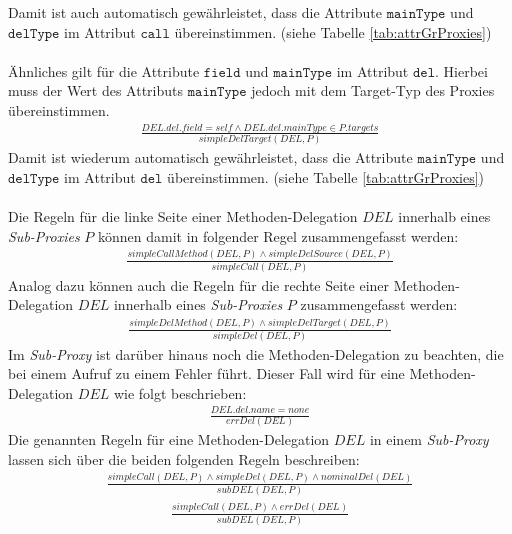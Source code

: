 \documentclass[a4paper,12pt]{article}
\begin{document}
Damit ist auch automatisch gewährleistet, dass die Attribute $\texttt{mainType}$ und $\texttt{delType}$ im Attribut $\texttt{call}$ übereinstimmen. (siehe Tabelle \ref{tab:attrGrProxies})\\\\
Ähnliches gilt für die Attribute $\texttt{field}$ und $\texttt{mainType}$ im Attribut $\texttt{del}$. Hierbei muss der Wert des Attributs $\texttt{mainType}$ jedoch mit dem Target-Typ des Proxies übereinstimmen.
\begin{gather*}
\frac{\mathit{DEL.del.field} = \mathit{self} \wedge  \mathit{DEL.del.mainType} \in \mathit{P.targets} }
{\mathit{simpleDelTarget(DEL, P)}}
\end{gather*}
Damit ist wiederum automatisch gewährleistet, dass die Attribute $\texttt{mainType}$ und $\texttt{delType}$ im Attribut $\texttt{del}$ übereinstimmen. (siehe Tabelle \ref{tab:attrGrProxies})\\\\
Die Regeln für die linke Seite einer Methoden-Delegation $\mathit{DEL}$ innerhalb eines \emph{Sub-Proxies} $P$ können damit in folgender Regel zusammengefasst werden:
\begin{gather*}
\frac{\mathit{simpleCallMethod(DEL,P)} \wedge \mathit{simpleDelSource(DEL,P)}}
{\mathit{simpleCall(DEL,P)}}
\end{gather*}
Analog dazu können auch die Regeln für die rechte Seite einer Methoden-Delegation $\mathit{DEL}$ innerhalb eines \emph{Sub-Proxies} $P$ zusammengefasst werden:
\begin{gather*}
\frac{\mathit{simpleDelMethod(DEL,P)} \wedge \mathit{simpleDelTarget(DEL,P)}}
{\mathit{simpleDel(DEL,P)}}
\end{gather*}
Im \emph{Sub-Proxy} ist darüber hinaus noch die Methoden-Delegation zu beachten, die bei einem Aufruf zu einem Fehler führt. Dieser Fall wird für eine Methoden-Delegation $\mathit{DEL}$ wie folgt beschrieben:
\begin{gather*}
\frac{\mathit{DEL.del.name} = \mathit{none}}
{\mathit{errDel(DEL)}}
\end{gather*}
Die genannten Regeln für eine Methoden-Delegation $\mathit{DEL}$ in einem \emph{Sub-Proxy} lassen sich über die beiden folgenden Regeln beschreiben:
\begin{gather*}
\frac{\mathit{simpleCall(DEL,P)} \wedge \mathit{simpleDel(DEL,P) \wedge \mathit{nominalDel(DEL)}}}
{\mathit{subDEL(DEL,P)}}
\end{gather*}
\begin{gather*}
\frac{\mathit{simpleCall(DEL,P)}\wedge\mathit{errDel(DEL)}
}
{\mathit{subDEL(DEL,P)}}
\end{gather*}
\end{document}
